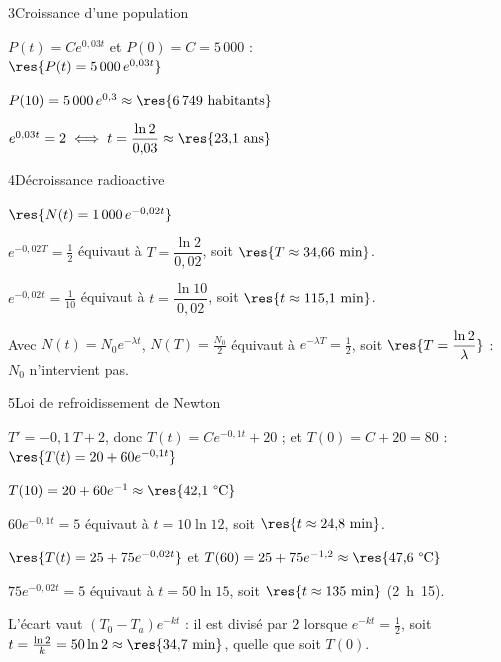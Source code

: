 \begin{deuxcolonnes}
\begin{corrige}{3}{Croissance d'une population}
\begin{questions}
  \item $P(t)=Ce^{0{,}03t}$ et $P(0)=C=5\,000$ :\\ $\res{P(t)=5\,000\,e^{0{,}03t}}$
  \item $P(10)=5\,000\,e^{0{,}3}\approx\res{6\,749\text{ habitants}}$
  \item $e^{0{,}03t}=2\iff t=\dfrac{\ln2}{0{,}03}\approx\res{23{,}1\text{ ans}}$
\end{questions}
\end{corrige}

\begin{corrige}{4}{Décroissance radioactive}
\begin{questions}
  \item $\res{N(t)=1\,000\,e^{-0{,}02t}}$
  \item $e^{-0{,}02T}=\frac12$ équivaut à $T=\dfrac{\ln2}{0{,}02}$, soit $\res{T\approx34{,}66\text{ min}}$.
  \item $e^{-0{,}02t}=\frac{1}{10}$ équivaut à $t=\dfrac{\ln10}{0{,}02}$, soit $\res{t\approx115{,}1\text{ min}}$.
  \item Avec $N(t)=N_0e^{-\lambda t}$, $N(T)=\frac{N_0}{2}$ équivaut à $e^{-\lambda T}=\frac12$, soit $\res{T=\dfrac{\ln2}{\lambda}}$ : $N_0$ n'intervient pas.
\end{questions}
\end{corrige}

\begin{corrige}{5}{Loi de refroidissement de Newton}
\begin{questions}
  \item $T'=-0{,}1\,T+2$, donc $T(t)=Ce^{-0{,}1t}+20$ ; et $T(0)=C+20=80$ :\\ $\res{T(t)=20+60e^{-0{,}1t}}$
  \item $T(10)=20+60e^{-1}\approx\res{42{,}1\text{ °C}}$
  \item $60e^{-0{,}1t}=5$ équivaut à $t=10\ln12$, soit $\res{t\approx24{,}8\text{ min}}$.
  \item $\res{T(t)=25+75e^{-0{,}02t}}$ et $T(60)=25+75e^{-1{,}2}\approx\res{47{,}6\text{ °C}}$
  \item $75e^{-0{,}02t}=5$ équivaut à $t=50\ln15$, soit $\res{t\approx135\text{ min}}$ (2~h~15).
  \item L'écart vaut $\left(T_0-T_a\right)e^{-kt}$ : il est divisé par $2$ lorsque $e^{-kt}=\frac12$, soit
    $t=\frac{\ln2}{k}=50\ln2\approx\res{34{,}7\text{ min}}$, quelle que soit $T(0)$.
\end{questions}
\end{corrige}


\end{deuxcolonnes}
